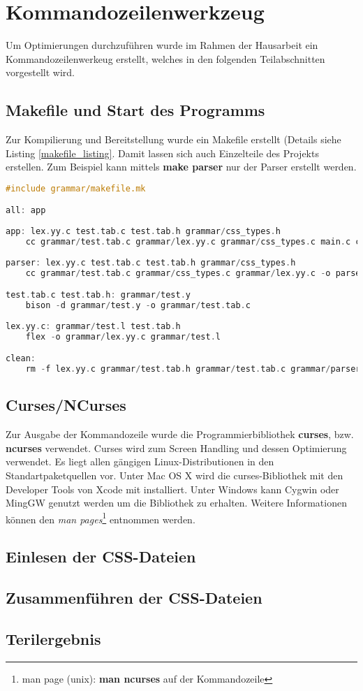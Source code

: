 \section{Kommandozeilenwerkzeug}
Um Optimierungen durchzuführen wurde im Rahmen der Hausarbeit ein Kommandozeilenwerkeug erstellt, welches in den folgenden Teilabschnitten vorgestellt wird.

\subsection{Makefile und Start des Programms}
Zur Kompilierung und Bereitstellung wurde ein Makefile erstellt (Details siehe Listing \ref{makefile_listing}. Damit lassen sich auch Einzelteile des Projekts erstellen. Zum Beispiel kann mittels \textbf{make parser} nur der Parser erstellt werden.
\begin{lstlisting}[label=makefile_listing,language=C, caption=Makefile]
#include grammar/makefile.mk

all: app
	
app: lex.yy.c test.tab.c test.tab.h grammar/css_types.h
	cc grammar/test.tab.c grammar/lex.yy.c grammar/css_types.c main.c cli_parse.c css_merge.c guiCSS.c optimizer.c output.c -lncurses -o optimCSS
	
parser: lex.yy.c test.tab.c test.tab.h grammar/css_types.h
	cc grammar/test.tab.c grammar/css_types.c grammar/lex.yy.c -o parser

test.tab.c test.tab.h: grammar/test.y
	bison -d grammar/test.y -o grammar/test.tab.c
            
lex.yy.c: grammar/test.l test.tab.h
	flex -o grammar/lex.yy.c grammar/test.l

clean: 
	rm -f lex.yy.c grammar/test.tab.h grammar/test.tab.c grammar/parser optimCSS
\end{lstlisting}
\subsection{Curses/NCurses}

Zur Ausgabe der Kommandozeile wurde die Programmierbibliothek \textbf{curses}, bzw. \textbf{ncurses} verwendet. Curses wird zum Screen Handling und dessen Optimierung verwendet. Es liegt allen gängigen Linux-Distributionen in den Standartpaketquellen vor. Unter Mac OS X wird die curses-Bibliothek mit den Developer Tools von Xcode mit installiert. Unter Windows kann Cygwin oder MingGW genutzt werden um die Bibliothek zu erhalten. Weitere Informationen können den \textit{man pages}\footnote{man page (unix): \textbf{man ncurses} auf der Kommandozeile} entnommen werden.

\subsection{Einlesen der CSS-Dateien}
\subsection{Zusammenführen der CSS-Dateien}
\subsection{Terilergebnis}
